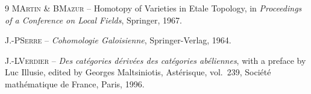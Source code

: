 \begin{thebibliography}{9}
%
\textsc{M\ptbl Artin \& B\ptbl Mazur} -- {\og Homotopy of Varieties in Etale Topology\fg}, in \emph{Proceedings of a Conference on Local Fields}, Springer, 1967.

%
\textsc{J.-P\ptbl Serre} -- \emph{Cohomologie Galoisienne}, Springer-Verlag, 1964.

%
\textsc{J.-L\ptbl Verdier} -- \emph{Des cat\'egories d\'eriv\'ees des cat\'egories ab\'eliennes}, with a preface by Luc Illusie, edited by Georges Maltsiniotis, Ast\'erisque, vol.~239, Soci\'et\'e math\'ematique de France, Paris, 1996.

\end{thebibliography}
